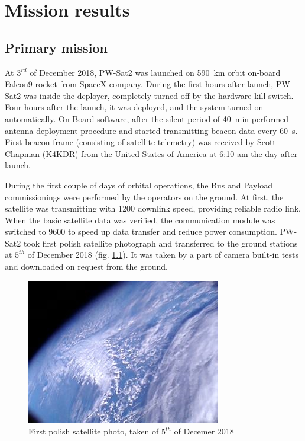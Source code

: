 \chapter{Mission results}

\section{Primary mission}
At $3^{rd}$ of December 2018, PW-Sat2 was launched on \SI{590}{\kilo\meter} orbit on-board Falcon9 rocket from SpaceX company. During the first hours after launch, PW-Sat2 was inside the deployer, completely turned off by the hardware kill-switch. Four hours after the launch, it was deployed, and the system turned on automatically. On-Board software, after the silent period of \SI{40}{\minute} performed antenna deployment procedure and started transmitting beacon data every \SI{60}{\second}. First beacon frame (consisting of satellite telemetry) was received by Scott Chapman (K4KDR) from the United States of America at 6:10 am the day after launch. 

During the first couple of days of orbital operations, the Bus and Payload commissionings were performed by the operators on the ground. At first, the satellite was transmitting with \SI{1200}{\bps} downlink speed, providing reliable radio link. When the basic satellite data was verified, the communication module was switched to \SI{9600}{\bps} to speed up data transfer and reduce power consumption. PW-Sat2 took first polish satellite photograph and transferred to the ground stations at $5^{th}$ of December 2018 (fig. \ref{sat_photo}). It was taken by a part of camera built-in tests and downloaded on request from the ground.

\begin{figure}[H]
    \centering
    \includegraphics[width=0.5\paperwidth]{img/9/sat_photo.jpg}
    \caption{First polish satellite photo, taken of $5^{th}$ of Decemer 2018}
    \label{sat_photo}
\end{figure}

